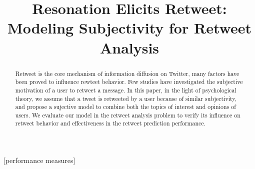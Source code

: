 \documentclass{acm_proc_article-sp}
\begin{document}
\title{Resonation Elicits Retweet: Modeling Subjectivity for Retweet Analysis}

\maketitle
\begin{abstract}
Retweet is the core mechanism of information diffusion on Twitter, many factors have been proved to influence rewteet behavior.
Few studies have investigated the subjective motivation of a user to retweet a message.
In this paper, in the light of psychological theory, we assume that a tweet is retweeted by a user because of similar subjectivity, and propose a sujective model to combine both the topics of interest and opinions of users. 
We evaluate our model in the retweet analysis problem to verify its influence on retweet behavior and effectiveness in the retweet prediction performance. 
\end{abstract}

[performance measures]


\end{document}
